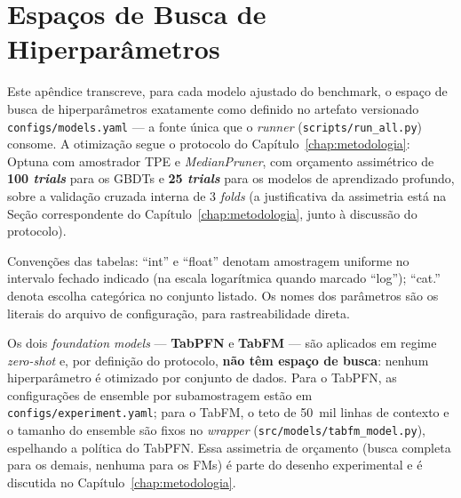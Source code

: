 \chapter{Espaços de Busca de Hiperparâmetros}
\label{app:espacos-busca}

Este apêndice transcreve, para cada modelo ajustado do benchmark, o
espaço de busca de hiperparâmetros exatamente como definido no
artefato versionado \texttt{configs/\allowbreak models.\allowbreak yaml} --- a fonte única que
o \emph{runner} (\texttt{scripts/\allowbreak run\_\allowbreak all.\allowbreak py}) consome. A otimização
segue o protocolo do Capítulo~\ref{chap:metodologia}: Optuna com amostrador TPE e
\emph{MedianPruner}, com orçamento assimétrico de \textbf{100
\emph{trials}} para os GBDTs e \textbf{25 \emph{trials}} para os
modelos de aprendizado profundo, sobre a validação cruzada interna de
3 \emph{folds} (a justificativa da assimetria está na Seção
correspondente do Capítulo~\ref{chap:metodologia}, junto à discussão do protocolo).

Convenções das tabelas: ``int'' e ``float'' denotam amostragem
uniforme no intervalo fechado indicado (na escala logarítmica quando
marcado ``log''); ``cat.'' denota escolha categórica no conjunto
listado. Os nomes dos parâmetros são os literais do arquivo de
configuração, para rastreabilidade direta.

Os dois \emph{foundation models} --- \textbf{TabPFN} e \textbf{TabFM}
--- são aplicados em regime \emph{zero-shot} e, por definição do
protocolo, \textbf{não têm espaço de busca}: nenhum hiperparâmetro é
otimizado por conjunto de dados. Para o TabPFN, as configurações de
ensemble por subamostragem estão em \texttt{configs/\allowbreak experiment.\allowbreak yaml};
para o TabFM, o teto de 50~mil linhas de contexto e o tamanho do
ensemble são fixos no \emph{wrapper} (\texttt{src/\allowbreak models/\allowbreak tabfm\_\allowbreak model.\allowbreak py}),
espelhando a política do TabPFN. Essa assimetria de orçamento
(busca completa para os demais, nenhuma para os FMs) é parte do
desenho experimental e é discutida no Capítulo~\ref{chap:metodologia}.

